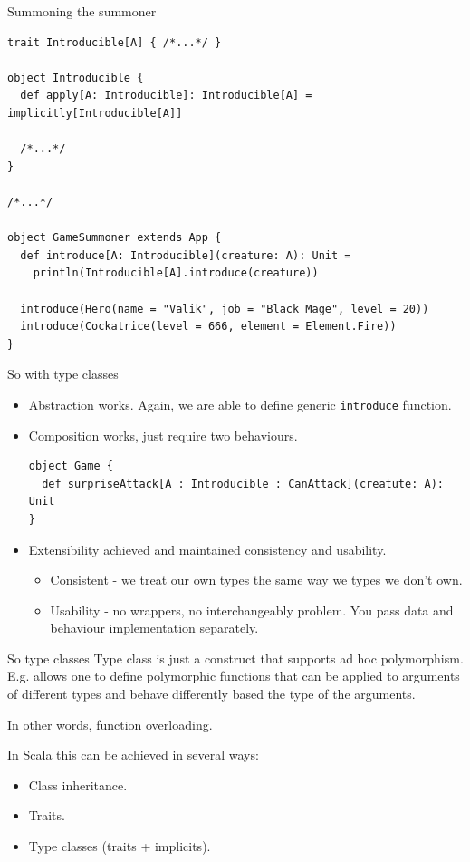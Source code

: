 \documentclass[presentation,aspectratio=169,smaller]{beamer}
\begin{document}
\begin{frame}[label={sec:orge87d81c},fragile]{Summoning the summoner}
 \begin{verbatim}
trait Introducible[A] { /*...*/ }

object Introducible {
  def apply[A: Introducible]: Introducible[A] = implicitly[Introducible[A]]

  /*...*/
}

/*...*/

object GameSummoner extends App {
  def introduce[A: Introducible](creature: A): Unit =
    println(Introducible[A].introduce(creature))

  introduce(Hero(name = "Valik", job = "Black Mage", level = 20))
  introduce(Cockatrice(level = 666, element = Element.Fire))
}
\end{verbatim}
\end{frame}

\begin{frame}[label={sec:orgde00f87},fragile]{So with type classes}
 \begin{itemize}
\item Abstraction works. Again, we are able to define generic \texttt{introduce} function.
\item Composition works, just require two behaviours.
\begin{verbatim}
object Game {
  def surpriseAttack[A : Introducible : CanAttack](creatute: A): Unit
}
\end{verbatim}
\item Extensibility achieved and maintained consistency and usability.
\begin{itemize}
\item Consistent - we treat our own types the same way we types we don't own.
\item Usability - no wrappers, no interchangeably problem. You pass data and
behaviour implementation separately.
\end{itemize}
\end{itemize}
\end{frame}

\begin{frame}[label={sec:org3fdc11e}]{So type classes}
Type class is just a construct that supports ad hoc polymorphism. E.g. allows
one to define polymorphic functions that can be applied to arguments of
different types and behave differently based the type of the arguments.

In other words, function overloading.

In Scala this can be achieved in several ways:

\begin{itemize}
\item Class inheritance.
\item Traits.
\item Type classes (traits + implicits).
\end{itemize}
\end{frame}
\end{document}
